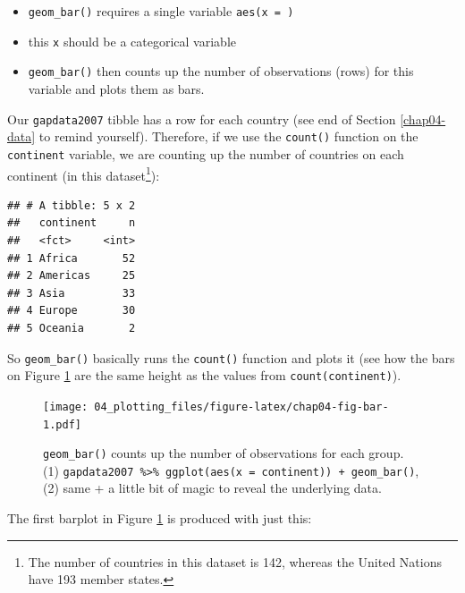 \documentclass[
  12pt,
  krantz2]{krantz}
\makeatletter
\newenvironment{Shaded}{\begin{snugshade}}{\end{snugshade}}
\newcommand{\DataTypeTok}[1]{\textcolor[rgb]{0.13,0.29,0.53}{#1}}
\newcommand{\KeywordTok}[1]{\textcolor[rgb]{0.13,0.29,0.53}{\textbf{#1}}}
\newcommand{\NormalTok}[1]{#1}
\newcommand{\OperatorTok}[1]{\textcolor[rgb]{0.81,0.36,0.00}{\textbf{#1}}}
\newcommand{\StringTok}[1]{\textcolor[rgb]{0.31,0.60,0.02}{#1}}
\providecommand{\tightlist}{%
  \setlength{\itemsep}{0pt}\setlength{\parskip}{0pt}}
\newenvironment{kframe}{%
\medskip{}
\setlength{\fboxsep}{.8em}
 \def\at@end@of@kframe{}%
 \ifinner\ifhmode%
  \def\at@end@of@kframe{\end{minipage}}%
  \begin{minipage}{\columnwidth}%
 \fi\fi%
 \def\FrameCommand##1{\hskip\@totalleftmargin \hskip-\fboxsep
 \colorbox{shadecolor}{##1}\hskip-\fboxsep
     \hskip-\linewidth \hskip-\@totalleftmargin \hskip\columnwidth}%
 \MakeFramed {\advance\hsize-\width
   \@totalleftmargin\z@ \linewidth\hsize
   \@setminipage}}%
 {\par\unskip\endMakeFramed%
 \at@end@of@kframe}
\renewenvironment{Shaded}{\begin{kframe}}{\end{kframe}}
\makeatother
\begin{document}
\begin{itemize}
\tightlist
\item
  \texttt{geom\_bar()} requires a single variable \texttt{aes(x\ =\ )}
\item
  this \texttt{x} should be a categorical variable
\item
  \texttt{geom\_bar()} then counts up the number of observations (rows) for this variable and plots them as bars.
\end{itemize}

Our \texttt{gapdata2007} tibble has a row for each country (see end of Section \ref{chap04-data} to remind yourself).
Therefore, if we use the \texttt{count()} function on the \texttt{continent} variable, we are counting up the number of countries on each continent (in this dataset\footnote{The number of countries in this dataset is 142, whereas the United Nations have 193 member states.}):

\begin{Shaded}
\end{Shaded}

\begin{verbatim}
## # A tibble: 5 x 2
##   continent     n
##   <fct>     <int>
## 1 Africa       52
## 2 Americas     25
## 3 Asia         33
## 4 Europe       30
## 5 Oceania       2
\end{verbatim}

So \texttt{geom\_bar()} basically runs the \texttt{count()} function and plots it (see how the bars on Figure \ref{fig:chap04-fig-bar} are the same height as the values from \texttt{count(continent)}).

\begin{figure}
\centering
\texttt{[image: 04\_plotting\_files/figure-latex/chap04-fig-bar-1.pdf]}
\caption{\label{fig:chap04-fig-bar}\texttt{geom\_bar()} counts up the number of observations for each group. (1) \texttt{gapdata2007\ \%\textgreater{}\%\ ggplot(aes(x\ =\ continent))\ +\ geom\_bar()}, (2) same + a little bit of magic to reveal the underlying data.}
\end{figure}

The first barplot in Figure \ref{fig:chap04-fig-bar} is produced with just this:

\begin{Shaded}
\end{Shaded}
\end{document}
